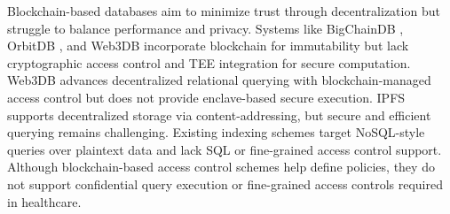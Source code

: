 \documentclass[conference]{IEEEtran}
\newcommand{\ours}{\xspace MtDB\xspace}
\begin{document}
Blockchain-based databases aim to minimize trust through decentralization but struggle to balance performance and privacy. Systems like BigChainDB \cite{mcconaghy2016bigchaindb}, OrbitDB \cite{orbitdb2021}, and Web3DB \cite{mukherjee2025web3db} incorporate blockchain for immutability but lack cryptographic access control and TEE integration for secure computation. Web3DB advances decentralized relational querying with blockchain-managed access control but does not provide enclave-based secure execution. IPFS supports decentralized storage via content-addressing, but secure and efficient querying remains challenging. Existing indexing schemes \cite{rathee2019blockchain, arer2022efficient, li2024ipfs} target NoSQL-style queries over plaintext data and lack SQL or fine-grained access control support. Although blockchain-based access control schemes \cite{zhang2018smart, liu2023tbac, wang2021dynamic} help define policies, they do not support confidential query execution or fine-grained access controls required in healthcare.


\end{document}
